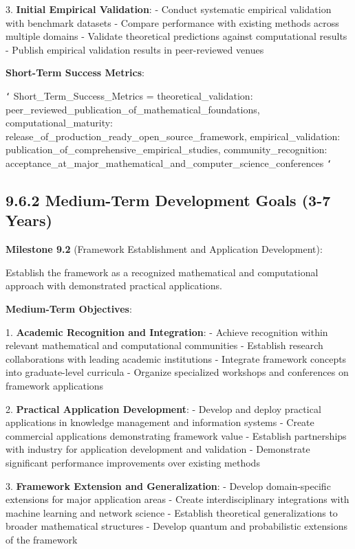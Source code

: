 3. \textbf{Initial Empirical Validation}:
   - Conduct systematic empirical validation with benchmark datasets
   - Compare performance with existing methods across multiple domains
   - Validate theoretical predictions against computational results
   - Publish empirical validation results in peer-reviewed venues

\textbf{Short-Term Success Metrics}:

\texttt{`}
Short_Term_Success_Metrics = {
    theoretical_validation: peer_reviewed_publication_of_mathematical_foundations,
    computational_maturity: release_of_production_ready_open_source_framework,
    empirical_validation: publication_of_comprehensive_empirical_studies,
    community_recognition: acceptance_at_major_mathematical_and_computer_science_conferences
}
\texttt{`}

\subsection{9.6.2 Medium-Term Development Goals (3-7 Years)}

\textbf{Milestone 9.2} (Framework Establishment and Application Development):

Establish the framework as a recognized mathematical and computational approach with demonstrated practical applications.

\textbf{Medium-Term Objectives}:

1. \textbf{Academic Recognition and Integration}:
   - Achieve recognition within relevant mathematical and computational communities
   - Establish research collaborations with leading academic institutions
   - Integrate framework concepts into graduate-level curricula
   - Organize specialized workshops and conferences on framework applications

2. \textbf{Practical Application Development}:
   - Develop and deploy practical applications in knowledge management and information systems
   - Create commercial applications demonstrating framework value
   - Establish partnerships with industry for application development and validation
   - Demonstrate significant performance improvements over existing methods

3. \textbf{Framework Extension and Generalization}:
   - Develop domain-specific extensions for major application areas
   - Create interdisciplinary integrations with machine learning and network science
   - Establish theoretical generalizations to broader mathematical structures
   - Develop quantum and probabilistic extensions of the framework


